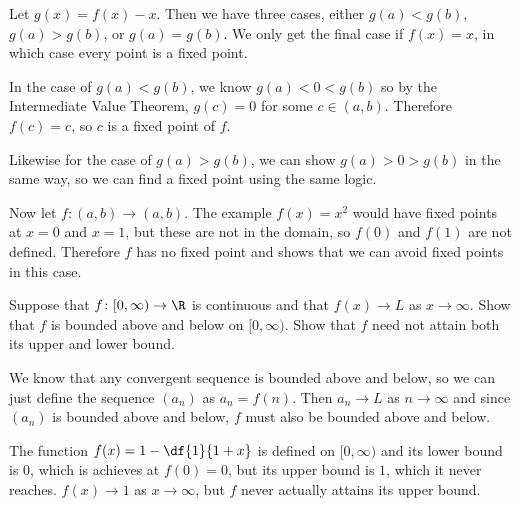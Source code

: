 \documentclass[a4paper]{article}
\begin{document}
Let $g(x) = f(x) - x$. Then we have three cases, either $g(a) < g(b)$, $g(a) > g(b)$, or $g(a) = g(b)$. We only get the final case if $f(x) = x$, in which case every point is a fixed point.

In the case of $g(a) < g(b)$, we know $g(a) < 0 < g(b)$
so by the Intermediate Value Theorem, $g(c) = 0$ for some $c \in (a, b)$. Therefore $f(c) = c$, so $c$ is a fixed point of $f$.

Likewise for the case of $g(a) > g(b)$, we can show $g(a) > 0 > g(b)$ in the same way, so we can find a fixed point using the same logic.

Now let $f : (a, b) \to (a, b)$. The example $f(x) = x^2$ would have fixed points at $x=0$ and $x=1$, but these are not in the domain, so $f(0)$ and $f(1)$ are not defined. Therefore $f$ has no fixed point and shows that we can avoid fixed points in this case.


\begin{questionbody}
Suppose that $f \colon [0, \infty) \to \R$ is continuous and that $f(x) \to L$ as $x \to \infty$. Show that $f$ is bounded above and below on $[0, \infty)$. %
Show that $f$ need not attain both its upper and lower bound.
\end{questionbody}

We know that any convergent sequence is bounded above and below, so we can just define the sequence $(a_n)$ as $a_n = f(n)$. Then $a_n \to L$ as $n \to \infty$ and since $(a_n)$ is bounded above and below, $f$ must also be bounded above and below.

The function $f(x) = 1 - \df{1}{1+x}$ is defined on $[0, \infty)$ %
and its lower bound is $0$, which is achieves at $f(0) = 0$, but its upper bound is $1$, which it never reaches. $f(x) \to 1$ as $x \to \infty$, but $f$ never actually attains its upper bound.
\end{document}
